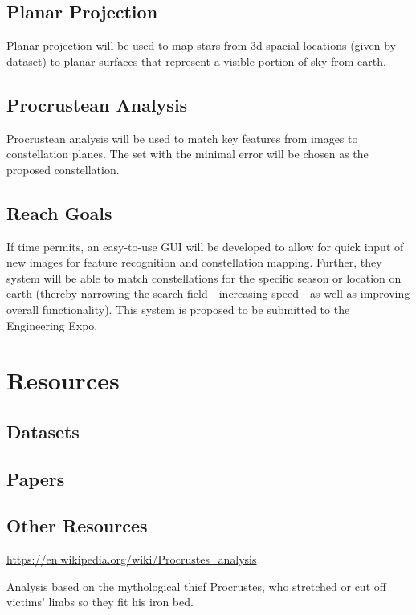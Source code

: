 \documentclass{article}
\begin{document}
\subsection{Planar Projection}
Planar projection will be used to map stars from 3d spacial locations (given by dataset) to planar surfaces that represent a visible portion of sky from earth. \par
\subsection{Procrustean Analysis}
Procrustean analysis will be used to match key features from images to constellation planes. The set with the minimal error will be chosen as the proposed constellation.
\subsection{Reach Goals}
If time permits, an easy-to-use GUI will be developed to allow for quick input of new images for feature recognition and constellation mapping. Further, they system will be able to match constellations for the specific season or location on earth (thereby narrowing the search field - increasing speed - as well as improving overall functionality). This system is proposed to be submitted to the Engineering Expo. 


\section{Resources}


\subsection{Datasets}

\subsection{Papers}



\subsection{Other Resources}
\url{https://en.wikipedia.org/wiki/Procrustes_analysis}

Analysis based on the mythological thief Procrustes, who stretched or cut off victims' limbs so they fit his iron bed.
\end{document}

